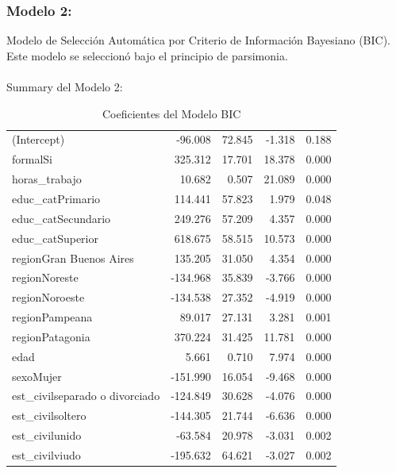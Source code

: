 \documentclass[
  spanish,
  letterpaper,
  DIV=11,
  numbers=noendperiod]{scrartcl}
\makeatletter
\let\oldparagraph\paragraph
\renewcommand{\paragraph}{
    \@ifstar
      \xxxParagraphStar
      \xxxParagraphNoStar
  }
\newcommand{\xxxParagraphStar}[1]{\oldparagraph*{#1}\mbox{}}
\newcommand{\xxxParagraphNoStar}[1]{\oldparagraph{#1}\mbox{}}
\makeatother
\begin{document}
\subsubsection{Modelo 2:}\label{modelo-2}

Modelo de Selección Automática por Criterio de Información Bayesiano
(BIC). Este modelo se seleccionó bajo el principio de parsimonia.

\paragraph{Summary del Modelo 2:}\label{summary-del-modelo-2}

\begin{longtable}[t]{lrrrr}
\caption{\label{tab:unnamed-chunk-3}Coeficientes del Modelo BIC}\\
\toprule
\cellcolor{black}{\textcolor{white}{Término}} & \cellcolor{black}{\textcolor{white}{Estimación}} & \cellcolor{black}{\textcolor{white}{Error Est.}} & \cellcolor{black}{\textcolor{white}{Estadístico t}} & \cellcolor{black}{\textcolor{white}{p-valor}}\\
\midrule
(Intercept) & -96.008 & 72.845 & -1.318 & 0.188\\
formalSi & 325.312 & 17.701 & 18.378 & 0.000\\
horas\_trabajo & 10.682 & 0.507 & 21.089 & 0.000\\
educ\_catPrimario & 114.441 & 57.823 & 1.979 & 0.048\\
educ\_catSecundario & 249.276 & 57.209 & 4.357 & 0.000\\
\addlinespace
educ\_catSuperior & 618.675 & 58.515 & 10.573 & 0.000\\
regionGran Buenos Aires & 135.205 & 31.050 & 4.354 & 0.000\\
regionNoreste & -134.968 & 35.839 & -3.766 & 0.000\\
regionNoroeste & -134.538 & 27.352 & -4.919 & 0.000\\
regionPampeana & 89.017 & 27.131 & 3.281 & 0.001\\
\addlinespace
regionPatagonia & 370.224 & 31.425 & 11.781 & 0.000\\
edad & 5.661 & 0.710 & 7.974 & 0.000\\
sexoMujer & -151.990 & 16.054 & -9.468 & 0.000\\
est\_civilseparado o divorciado & -124.849 & 30.628 & -4.076 & 0.000\\
est\_civilsoltero & -144.305 & 21.744 & -6.636 & 0.000\\
\addlinespace
est\_civilunido & -63.584 & 20.978 & -3.031 & 0.002\\
est\_civilviudo & -195.632 & 64.621 & -3.027 & 0.002\\
\bottomrule
\end{longtable}
\end{document}
